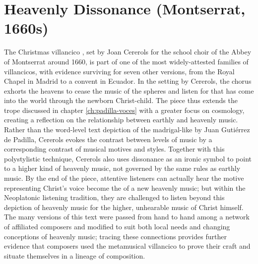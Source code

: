 
% 
% 
%

\chapter{Heavenly Dissonance (Montserrat, 1660s)}
\label{ch:cererols-suspended}

The Christmas villancico , set by
Joan Cererols for the school choir of the Abbey of Montserrat around 1660, is
part of one of the most widely-attested families of villancicos, with evidence
surviving for seven other versions, from the Royal Chapel in Madrid to a convent
in Ecuador.
In the setting by Cererols, the chorus exhorts the heavens to cease the music of
the spheres and listen for  that has come into the
world through the newborn Christ-child.
The piece thus extends the  trope discussed in chapter
\ref{ch:padilla-voces} with a greater focus on cosmology, creating a reflection
on the relationship between earthly and heavenly music.
Rather than the word-level text depiction of the madrigal-like  by
Juan Gutiérrez de Padilla, Cererols evokes the contrast between levels of music
by a corresponding contrast of musical motives and styles.
Together with this polystylistic technique, Cererols also uses dissonance as an
ironic symbol to point to a higher kind of heavenly music, not governed by the
same rules as earthly music.
By the end of the piece, attentive listeners can actually hear the motive
representing Christ's voice become the  of a new heavenly
music; but within the Neoplatonic listening tradition, they are challenged to
listen beyond this depiction of heavenly music for the higher, unhearable music
of Christ himself.
The many versions of this text were passed from hand to hand among a network of
affiliated composers and modified to suit both local needs and changing
conceptions of heavenly music; tracing these connections provides further
evidence that composers used the metamusical villancico to prove their craft and
situate themselves in a lineage of composition.

